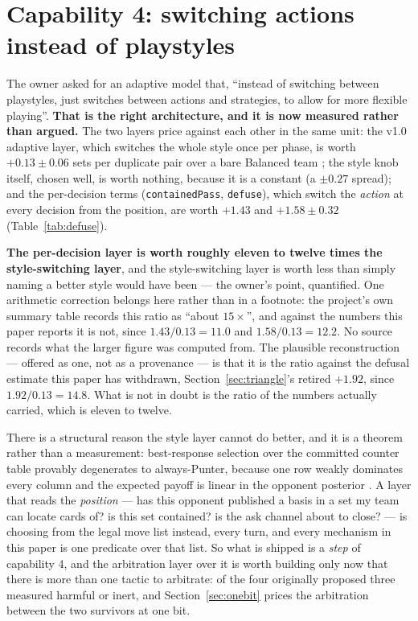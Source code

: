 \documentclass[11pt]{article}
\newcommand{\code}[1]{\texttt{#1}}
\begin{document}
\section{Capability 4: switching actions instead of playstyles}
\label{sec:capability4}

The owner asked for an adaptive model that, ``instead of switching between playstyles, just switches
between actions and strategies, to allow for more flexible playing''. \textbf{That is the right
architecture, and it is now measured rather than argued.} The two layers price against each other in
the same unit: the v1.0 adaptive layer, which switches the whole style once per phase, is worth
$+0.13 \pm 0.06$ sets per duplicate pair over a bare Balanced team \cite{v10paper,adaptive,bounded};
the style knob itself, chosen well, is worth nothing, because it is a constant (a $\pm 0.27$
spread); and the per-decision terms (\code{containedPass}, \code{defuse}), which switch the
\emph{action} at every decision from the position, are worth $+1.43$ and $+1.58 \pm 0.32$
(Table~\ref{tab:defuse}).

\textbf{The per-decision layer is worth roughly eleven to twelve times the style-switching layer},
and the style-switching layer is worth less than simply naming a better style would have been ---
the owner's point, quantified. One arithmetic correction belongs here rather than in a footnote: the
project's own summary table records this ratio as ``about $15\times$'', and against the numbers this
paper reports it is not, since $1.43/0.13 = 11.0$ and $1.58/0.13 = 12.2$. No source records what
the larger figure was computed from. The plausible reconstruction --- offered as one, not as a
provenance --- is that it is the ratio against the defusal estimate this paper has withdrawn,
Section~\ref{sec:triangle}'s retired $+1.92$, since $1.92/0.13 = 14.8$. What is not in doubt is the
ratio of the numbers actually carried, which is eleven to twelve.

There is a structural reason the style layer cannot do better, and it is a theorem rather than a
measurement: best-response selection over the committed counter table provably degenerates to
always-Punter, because one row weakly dominates every column and the expected payoff is linear in
the opponent posterior \cite{v10paper,adaptive}. A layer that reads the \emph{position} --- has this
opponent published a basis in a set my team can locate cards of? is this set contained? is the ask
channel about to close? --- is choosing from the legal move list instead, every turn, and every
mechanism in this paper is one predicate over that list. So what is shipped is a \emph{step} of
capability 4, and the arbitration layer over it is worth building only now that there is more than
one tactic to arbitrate: of the four originally proposed three measured harmful or inert, and
Section~\ref{sec:onebit} prices the arbitration between the two survivors at one bit.
\end{document}
